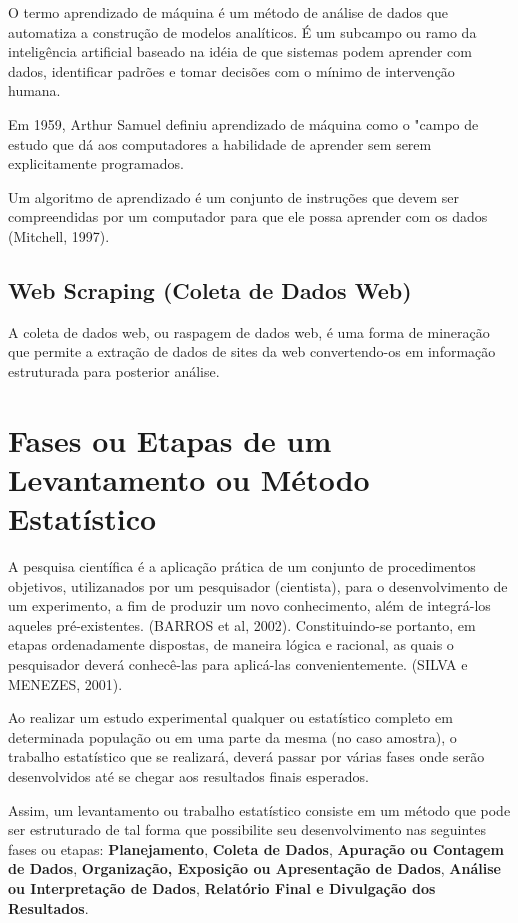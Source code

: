 O termo aprendizado de máquina é um método de análise de dados que automatiza a construção de modelos analíticos. É um subcampo ou ramo da inteligência artificial baseado na idéia de que sistemas podem aprender com dados, identificar padrões e tomar decisões com o mínimo de intervenção humana.\vskip0.3cm

Em 1959, Arthur Samuel definiu aprendizado de máquina como o "campo de estudo que dá aos computadores a habilidade de aprender sem serem explicitamente programados.\vskip0.3cm

Um algoritmo de aprendizado é um conjunto de instruções que devem ser compreendidas
por um computador para que ele possa aprender com os dados (Mitchell, 1997).



\subsection{Web Scraping (Coleta de Dados Web)}

A coleta de dados web, ou raspagem de dados web, é uma forma de mineração que permite a extração de dados de sites da web convertendo-os em informação estruturada para posterior análise.




\newpage
\section{Fases ou Etapas de um Levantamento ou Método Estatístico}

\inic A pesquisa científica é a aplicação prática de um conjunto de procedimentos objetivos, utilizanados por um pesquisador (cientista), para o desenvolvimento de um experimento, a fim de produzir um novo conhecimento, além de integrá-los aqueles pré-existentes. (BARROS et al, 2002). Constituindo-se portanto, em etapas ordenadamente dispostas, de maneira lógica e racional, as quais o pesquisador deverá conhecê-las para aplicá-las convenientemente. (SILVA e MENEZES, 2001). 
\vskip0.3cm


Ao realizar um estudo experimental qualquer ou estatístico completo em determinada população ou em uma parte da mesma (no caso amostra), o trabalho estatístico que se realizará, deverá passar por várias fases onde serão desenvolvidos até se chegar aos resultados finais esperados.\vskip0.3cm

Assim, um levantamento ou trabalho estatístico consiste em um
método que pode ser estruturado de tal forma que possibilite seu
desenvolvimento nas seguintes fases ou etapas:
\textbf{Planejamento}, \textbf{Coleta de Dados}, \textbf{Apuração
ou Contagem de Dados}, \textbf{Organização, Exposição ou
Apresentação de Dados}, \textbf{Análise ou Interpretação de
Dados}, \textbf{Relatório Final e Divulgação dos Resultados}.


